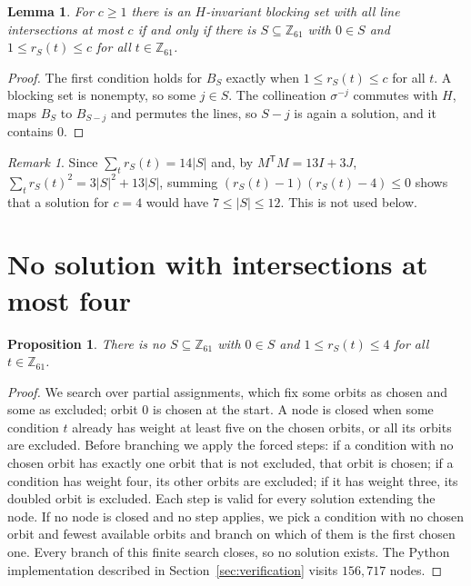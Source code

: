 \documentclass[11pt]{article}
\newtheorem{lemma}[theorem]{Lemma}
\newtheorem{proposition}[theorem]{Proposition}
\theoremstyle{remark}
\newtheorem{remark}[theorem]{Remark}
\newcommand{\Z}{\mathbb{Z}}
\begin{document}
\begin{lemma}\label{lem:reduction}
For $c\ge1$ there is an $H$-invariant blocking set with all line intersections
at most $c$ if and only if there is $S\subseteq\Z_{61}$ with $0\in S$ and
$1\le r_S(t)\le c$ for all $t\in\Z_{61}$.
\end{lemma}

\begin{proof}
The first condition holds for $B_S$ exactly when $1\le r_S(t)\le c$ for all
$t$. A blocking set is nonempty, so some $j\in S$. The collineation
$\sigma^{-j}$ commutes with $H$, maps $B_S$ to $B_{S-j}$ and permutes the
lines, so $S-j$ is again a solution, and it contains $0$.
\end{proof}

\begin{remark}
Since $\sum_t r_S(t)=14|S|$ and, by $M^{\mathsf T}M=13I+3J$,
$\sum_t r_S(t)^2=3|S|^2+13|S|$, summing $(r_S(t)-1)(r_S(t)-4)\le0$ shows that a
solution for $c=4$ would have $7\le|S|\le12$. This is not used below.
\end{remark}

\section{No solution with intersections at most four}\label{sec:search}

\begin{proposition}\label{prop:unsat}
There is no $S\subseteq\Z_{61}$ with $0\in S$ and $1\le r_S(t)\le4$ for all
$t\in\Z_{61}$.
\end{proposition}

\begin{proof}
We search over partial assignments, which fix some orbits as chosen and some
as excluded; orbit $0$ is chosen at the start. A node is closed when some
condition $t$ already has weight at least five on the chosen orbits, or all
its orbits are excluded. Before branching we apply the forced steps: if a
condition with no chosen orbit has exactly one orbit that is not excluded,
that orbit is chosen; if a condition has weight four, its other orbits are
excluded; if it has weight three, its doubled orbit is excluded. Each step
is valid for every solution extending the node. If no node is closed and no
step applies, we pick a condition with no chosen orbit and fewest available
orbits and branch on which of them is the first chosen one. Every branch of
this finite search closes, so no solution exists. The Python implementation
described in Section~\ref{sec:verification} visits $156{,}717$ nodes.
\end{proof}
\end{document}
